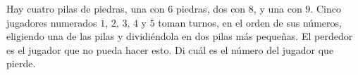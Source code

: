 Hay cuatro pilas de piedras, una con $6$ piedras, dos con $8$, y una con $9$. Cinco jugadores numerados $1$, $2$, $3$, $4$ y $5$ toman turnos, en el orden de sus números, eligiendo una de las pilas y dividiéndola en dos pilas más pequeñas. El perdedor es el jugador que no pueda hacer esto. Di cuál es el número del jugador que pierde.
